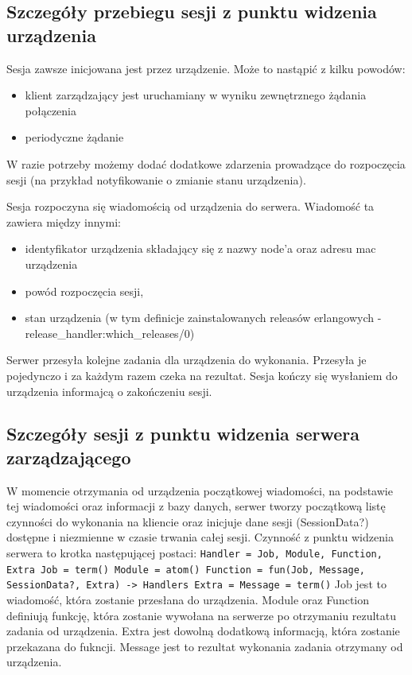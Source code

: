 \documentclass[polish,12pt]{aghthesis}
\begin{document}
\subsection{Szczegóły przebiegu sesji z punktu widzenia urządzenia}
Sesja zawsze inicjowana jest przez urządzenie. Może to nastąpić z kilku powodów:
\begin{itemize}
\item klient zarządzający jest uruchamiany w wyniku zewnętrznego żądania połączenia
\item periodyczne żądanie
\end{itemize}
W razie potrzeby możemy dodać dodatkowe zdarzenia prowadzące do rozpoczęcia sesji (na przykład notyfikowanie o zmianie stanu urządzenia).

Sesja rozpoczyna się wiadomością od urządzenia do serwera. Wiadomość ta zawiera między innymi:
\begin{itemize}
\item identyfikator urządzenia składający się z nazwy node'a oraz adresu mac urządzenia
\item powód rozpoczęcia sesji,
\item stan urządzenia (w tym definicje zainstalowanych releasów erlangowych - release\_handler:which\_releases/0)
\end{itemize}
Serwer przesyła kolejne zadania dla urządzenia do wykonania. Przesyła je pojedynczo i za każdym razem czeka na rezultat. Sesja kończy się wysłaniem do urządzenia informajcą o zakończeniu sesji.

\subsection{Szczegóły sesji z punktu widzenia serwera zarządzającego}
W momencie otrzymania od urządzenia początkowej wiadomości, na podstawie tej wiadomości oraz informacji z bazy danych, serwer tworzy początkową listę czynności do wykonania na kliencie oraz inicjuje dane sesji (SessionData?) dostępne i niezmienne w czasie trwania całej sesji. Czynność z punktu widzenia serwera to krotka następującej postaci: \texttt{Handler = {Job, Module, Function, Extra} Job = term() Module = atom() Function = fun(Job, Message, SessionData?, Extra) -> Handlers Extra = Message = term()} Job jest to wiadomość, która zostanie przesłana do urządzenia. Module oraz Function definiują funkcję, która zostanie wywołana na serwerze po otrzymaniu rezultatu zadania od urządzenia. Extra jest dowolną dodatkową informacją, która zostanie przekazana do fukncji. Message jest to rezultat wykonania zadania otrzymany od urządzenia.
\end{document}

